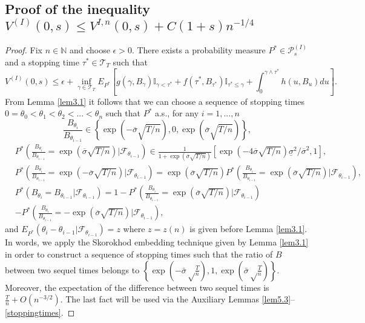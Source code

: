 \documentclass{amsart}
\numberwithin{equation}{section}
\begin{document}
\subsection{Proof of the inequality $V^{(I)}(0,s)\leq V^{I,n}(0,s)+C(1+s) n^{-1/4}$}
\begin{proof}
Fix $n\in\mathbb N$ and choose $\epsilon>0$. There exists a probability
measure $P^*\in \mathcal P^{(I)}_s$ and a stopping time $\tau^*\in\mathcal T_T$ such that
\begin{equation}\label{4.1}
V^{(I)}(0,s)\leq \epsilon+ \inf_{\gamma\in\mathcal T_{T}}E_{P^*}
\left[g(\gamma, B_{\gamma}){\mathbb I}_{\gamma<\tau^*}+
f(\tau^*,B_{\tau^*})\mathbb{I}_{\tau^*\leq\gamma}+\int_{0}^{\gamma\wedge\tau^*}h(u, B_{u})du\right].
\end{equation}
From Lemma \ref{lem3.1} it follows that we can choose a sequence of stopping times
$0=\theta_0<\theta_1<\theta_2<...<\theta_n$ such that $P^*$ a.s., for any $i=1,...,n$
\[
\frac{B_{\theta_i}}{B_{\theta_{i-1}}}\in \left
\{\exp(-\overline{\sigma}\sqrt{T/n}),0,\exp(\overline{\sigma}\sqrt{T/n})
\right\},\]
\begin{eqnarray*}
&P^*\left(\frac{B_{\theta_i}}{B_{\theta_{i-1}}}=\exp(\overline{\sigma}\sqrt {T/n})|\mathcal F_{\theta_{i-1}}\right)
\in \frac{1}{1+\exp(\overline{\sigma}\sqrt{T/n})}\left[\exp\left(-4\overline{\sigma}\sqrt{T/n}\right)\underline{\sigma}^2/\overline{\sigma}^2,1\right],\\
& P^*\left(\frac{B_{\theta_i}}{B_{\theta_{i-1}}}=\exp(-\overline{\sigma}\sqrt{T/n})|\mathcal F_{\theta_{i-1}}\right)=\exp(\overline{\sigma}\sqrt{T/n})
P^*\left(\frac{ B_{\theta_i}}{ B_{\theta_{i-1}}}=\exp(\overline{\sigma}\sqrt {T/n})|\mathcal F_{\theta_{i-1}}\right)\label{4.2},\\
& P^*\left({B_{\theta_i}}={ B_{\theta_{i-1}}}|\mathcal F_{\theta_{i-1}}\right)=1-
P^*\left(\frac{B_{\theta_i}}{B_{\theta_{i-1}}}=\exp(\overline{\sigma}\sqrt {T/n})|\mathcal F_{\theta_{i-1}}\right)\label{4.3}\\
&- P^*\left(\frac{B_{\theta_i}}{B_{\theta_{i-1}}}=-\exp(\overline{\sigma}\sqrt {T/n})|\mathcal F_{\theta_{i-1}}\right),\nonumber
\end{eqnarray*}
and
$E_{P^*}(\theta_i-\theta_{i-1}|\mathcal F_{\theta_{i-1}})=z$
where $z=z(n)$ is given before Lemma \ref{lem3.1}.
In words, we apply the Skorokhod embedding technique given by Lemma \ref{lem3.1} in order to
construct a sequence of stopping times
such that the ratio of $B$ between two sequel times
belongs to
$\left\{\exp\left(-\bar\sigma\sqrt\frac{T}{n}\right),1,\exp\left(\bar\sigma\sqrt\frac{T}{n}\right)\right\}$.
Moreover, the expectation of the
difference between two sequel times is $\frac{T}{n}+O(n^{-3/2})$. The last fact
will be used via the Auxiliary Lemmas \ref{lem5.3}--\ref{stoppingtimes}.


\end{proof}
\end{document}
